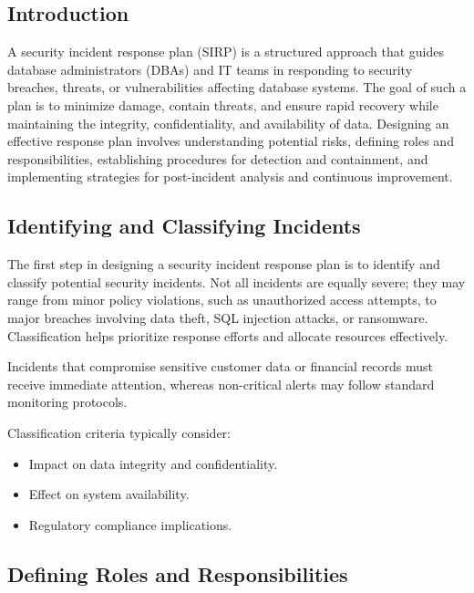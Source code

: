 \documentclass[12pt,a4paper]{article}
\begin{document}
\subsection*{Introduction}

A security incident response plan (SIRP) is a structured approach that guides database administrators (DBAs) and IT teams in responding to security breaches, threats, or vulnerabilities affecting database systems. The goal of such a plan is to minimize damage, contain threats, and ensure rapid recovery while maintaining the integrity, confidentiality, and availability of data. Designing an effective response plan involves understanding potential risks, defining roles and responsibilities, establishing procedures for detection and containment, and implementing strategies for post-incident analysis and continuous improvement.

\subsection{Identifying and Classifying Incidents}

The first step in designing a security incident response plan is to identify and classify potential security incidents. Not all incidents are equally severe; they may range from minor policy violations, such as unauthorized access attempts, to major breaches involving data theft, SQL injection attacks, or ransomware. Classification helps prioritize response efforts and allocate resources effectively.

\begin{example}
Incidents that compromise sensitive customer data or financial records must receive immediate attention, whereas non-critical alerts may follow standard monitoring protocols.
\end{example}

Classification criteria typically consider:
\begin{itemize}
  \item Impact on data integrity and confidentiality.
  \item Effect on system availability.
  \item Regulatory compliance implications.
\end{itemize}

\subsection{Defining Roles and Responsibilities}
\end{document}
